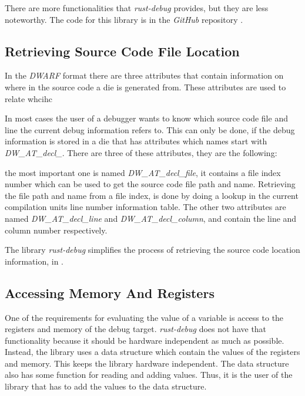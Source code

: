 There are more functionalities that \emph{rust-debug} provides, but they are less noteworthy.
The code for this library is in the \emph{GitHub} repository \cite{rust-debug}.



\subsection{Retrieving Source Code File Location}
In the \emph{DWARF} format there are three attributes that contain information on where in the source code a \gls{die} is generated from.
These attributes are used to relate whcihc 


In most cases the user of a debugger wants to know which source code file and line the current debug information refers to.
This can only be done, if the debug information is stored in a \gls{die} that has attributes which names start with \emph{DW\_AT\_decl\_}.
There are three of these attributes, they are the following:

the most important one is named \emph{DW\_AT\_decl\_file}, it contains a file index number which can be used to get the source code file path and name.
Retrieving the file path and  name from a file index, is done by doing a lookup in the current compilation units line number information table.
The other two attributes are named \emph{DW\_AT\_decl\_line} and \emph{DW\_AT\_decl\_column}, and contain the line and column number respectively.

The library \emph{rust-debug} simplifies the process of retrieving the source code location information, in .


\subsection{Accessing Memory And Registers}
One of the requirements for evaluating the value of a variable is access to the registers and memory of the debug target.
\emph{rust-debug} does not have that functionality because it should be hardware independent as much as possible.
Instead, the library uses a data structure which contain the values of the registers and memory.
This keeps the library hardware independent.
The data structure also has some function for reading and adding values.
Thus, it is the user of the library that has to add the values to the data structure.


